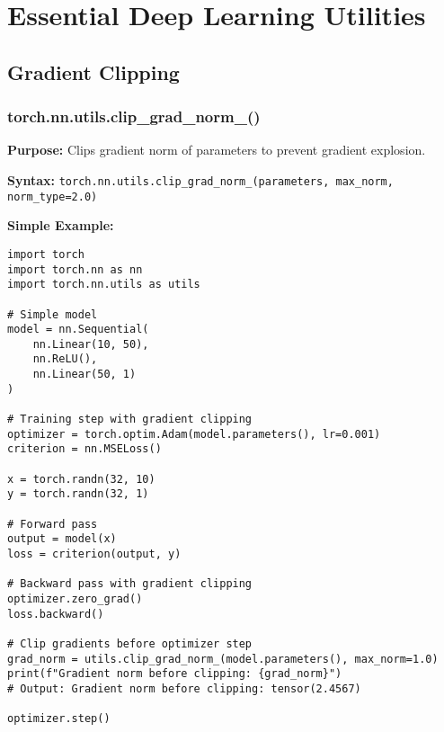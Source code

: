 \documentclass[11pt,a4paper]{book}
\begin{document}
\chapter{Essential Deep Learning Utilities}

\section{Gradient Clipping}

\subsection{torch.nn.utils.clip\_grad\_norm\_()}

\textbf{Purpose:} Clips gradient norm of parameters to prevent gradient explosion.

\textbf{Syntax:} \texttt{torch.nn.utils.clip\_grad\_norm\_(parameters, max\_norm, norm\_type=2.0)}

\textbf{Simple Example:}
\begin{verbatim}
import torch
import torch.nn as nn
import torch.nn.utils as utils

# Simple model
model = nn.Sequential(
    nn.Linear(10, 50),
    nn.ReLU(),
    nn.Linear(50, 1)
)

# Training step with gradient clipping
optimizer = torch.optim.Adam(model.parameters(), lr=0.001)
criterion = nn.MSELoss()

x = torch.randn(32, 10)
y = torch.randn(32, 1)

# Forward pass
output = model(x)
loss = criterion(output, y)

# Backward pass with gradient clipping
optimizer.zero_grad()
loss.backward()

# Clip gradients before optimizer step
grad_norm = utils.clip_grad_norm_(model.parameters(), max_norm=1.0)
print(f"Gradient norm before clipping: {grad_norm}")
# Output: Gradient norm before clipping: tensor(2.4567)

optimizer.step()
\end{verbatim}
\end{document}
